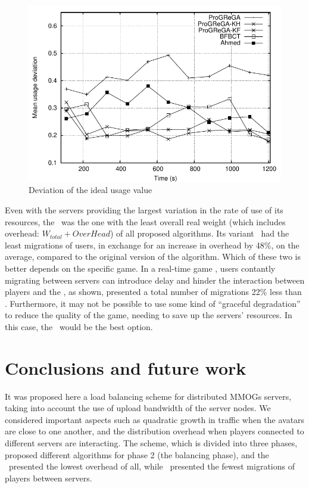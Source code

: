 \begin{figure}[!t]
  \centering
  \includegraphics[width=0.9\linewidth]{images/baldeviation_ah}
  \caption{Deviation of the ideal usage value}
  \label{gra:baldeviation}
\end{figure}

Even with the servers providing the largest variation in the rate of use of its resources, the \ggp\ was the one with the least overall real weight (which includes overhead: $W_{total} + OverHead$) of all proposed algorithms. Its variant \ggpf\ had the least migrations of users, in exchange for an increase in overhead by 48\%, on the average, compared to the original version of the algorithm. Which of these two is better depends on the specific game. In a real-time game , users contantly migrating between servers can introduce delay and hinder the interaction between players and the \ggpf, as shown, presented a total number of migrations 22\% less than \ggp. Furthermore, it may not be possible to use some kind of ``graceful degradation'' to reduce the quality of the game, needing to save up the servers' resources. In this case, the \ggp\ would be the best option.

\section{Conclusions and future work}

It was proposed here a load balancing scheme for distributed MMOGs servers, taking into account the use of upload bandwidth of the server nodes. We considered important aspects such as quadratic growth in traffic when the avatars are close to one another, and the distribution overhead when players connected to different servers are interacting. The scheme, which is divided into three phases, proposed different algorithms for phase 2 (the balancing phase), and the \ggp\ presented the lowest overhead of all, while \ggpf\ presented the fewest migrations of players between servers.

